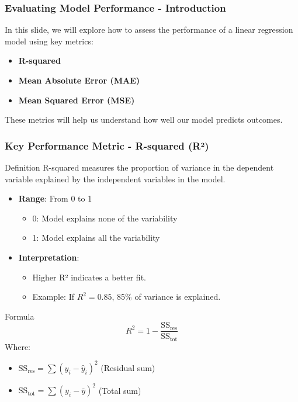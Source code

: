 \documentclass[aspectratio=169]{beamer}
\begin{document}
\begin{frame}[fragile]
    \frametitle{Evaluating Model Performance - Introduction}
    In this slide, we will explore how to assess the performance of a linear regression model using key metrics:
    \begin{itemize}
        \item \textbf{R-squared}
        \item \textbf{Mean Absolute Error (MAE)}
        \item \textbf{Mean Squared Error (MSE)}
    \end{itemize}
    These metrics will help us understand how well our model predicts outcomes.
\end{frame}

\begin{frame}[fragile]
    \frametitle{Key Performance Metric - R-squared (R²)}
    \begin{block}{Definition}
        R-squared measures the proportion of variance in the dependent variable explained by the independent variables in the model.
    \end{block}
    \begin{itemize}
        \item \textbf{Range}: From 0 to 1
        \begin{itemize}
            \item 0: Model explains none of the variability
            \item 1: Model explains all the variability
        \end{itemize}
        \item \textbf{Interpretation}:
        \begin{itemize}
            \item Higher R² indicates a better fit.
            \item Example: If $R^2 = 0.85$, 85\% of variance is explained.
        \end{itemize}
    \end{itemize}
    \begin{block}{Formula}
        \begin{equation}
            R^2 = 1 - \frac{\text{SS}_{\text{res}}}{\text{SS}_{\text{tot}}}
        \end{equation}
        Where:
        \begin{itemize}
            \item $\text{SS}_{\text{res}} = \sum (y_i - \hat{y}_i)^2$ (Residual sum)
            \item $\text{SS}_{\text{tot}} = \sum (y_i - \bar{y})^2$ (Total sum)
        \end{itemize}
    \end{block}
\end{frame}
\end{document}
